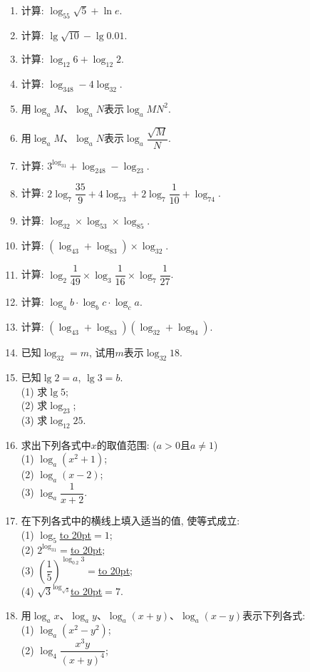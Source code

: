 \documentclass[10pt,a4paper]{article}
\newcommand{\blank}[1]{\underline{\hbox to #1pt{}}}
\begin{document}
\begin{enumerate}[1.]
(3) $\log _{100}1000=x$, $x=$\blank{50};\\
(4) $\log _x16=4$, $x=$\blank{50}.
\item 计算: $\log _55\sqrt 5+\ln e$.
\item 计算: $\lg \sqrt {10}-\lg 0.01$.
\item 计算: $\log _{12}6+\log _{12}2$.
\item 计算: $\log _348-4\log _32$.
\item 用$\log _aM$、$\log _aN$表示$\log _aMN^2$.
\item 用$\log _aM$、$\log _aN$表示$\log _a\dfrac{\sqrt M}N$.
\item 计算: $3^{\log _31}+\log _248-\log _23$.
\item 计算: $2\log _7\dfrac{35}9+4\log _73+2\log _7\dfrac 1{10}+\log _74$.
\item 计算: $\log _32\times \log _53\times \log _85$.
\item 计算: $(\log _43+\log _83)\times \log _32$.
\item 计算: $\log _2\dfrac 1{49}\times \log _3\dfrac 1{16}\times \log _7\dfrac 1{27}$.
\item 计算: $\log _ab\cdot \log _bc\cdot \log _ca$.
\item 计算: $(\log _43+\log _83)(\log _32+\log _94)$.
\item 已知$\log _32=m$, 试用$m$表示$\log _{32}18$.
\item 已知$\lg 2=a$, $\lg 3=b$.\\
(1) 求$\lg 5$;\\
(2) 求$\log _23$;\\
(3) 求$\log _{12}25$.
\item 求出下列各式中$x$的取值范围: ($a>0$且$a\ne 1$)\\
(1) $\log _a(x^2+1)$;\\
(2) $\log _a(x-2)$;\\
(3) $\log _a\dfrac 1{x+2}$.
\item 在下列各式中的横线上填入适当的值, 使等式成立:\\
(1) $\log _5$\blank{20}$=1$;\\
(2) $2^{\log _31}=$\blank{20};\\
(3) $(\dfrac 15)^{\log _{0.2}3}=$\blank{20};\\
(4) $\sqrt 3^{\log _{\sqrt 3}}$\blank{20}$=7$.
\item 用$\log _ax$、$\log _ay$、$\log _a(x+y)$、$\log _a(x-y)$表示下列各式:\\
(1) $\log _a(x^2-y^2)$;\\
(2) $\log _4\dfrac{x^3y}{(x+y)^4}$;\\

\end{enumerate}
\end{document}
